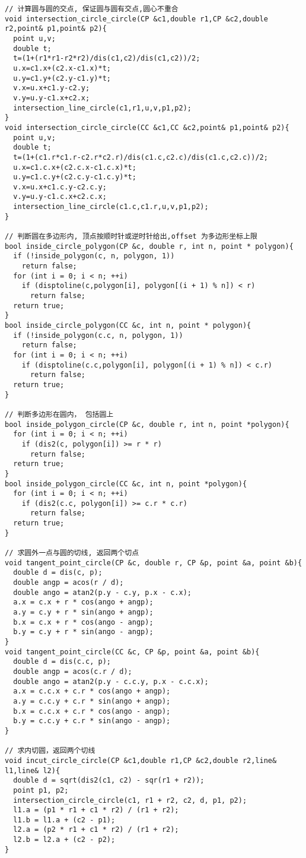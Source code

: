 \begin{lstlisting}[language={}]
// 计算圆与圆的交点, 保证圆与圆有交点,圆心不重合
void intersection_circle_circle(CP &c1,double r1,CP &c2,double r2,point& p1,point& p2){
  point u,v;
  double t;
  t=(1+(r1*r1-r2*r2)/dis(c1,c2)/dis(c1,c2))/2;
  u.x=c1.x+(c2.x-c1.x)*t;
  u.y=c1.y+(c2.y-c1.y)*t;
  v.x=u.x+c1.y-c2.y;
  v.y=u.y-c1.x+c2.x;
  intersection_line_circle(c1,r1,u,v,p1,p2);
}
void intersection_circle_circle(CC &c1,CC &c2,point& p1,point& p2){
  point u,v;
  double t;
  t=(1+(c1.r*c1.r-c2.r*c2.r)/dis(c1.c,c2.c)/dis(c1.c,c2.c))/2;
  u.x=c1.c.x+(c2.c.x-c1.c.x)*t;
  u.y=c1.c.y+(c2.c.y-c1.c.y)*t;
  v.x=u.x+c1.c.y-c2.c.y;
  v.y=u.y-c1.c.x+c2.c.x;
  intersection_line_circle(c1.c,c1.r,u,v,p1,p2);
}

// 判断圆在多边形内, 顶点按顺时针或逆时针给出,offset 为多边形坐标上限
bool inside_circle_polygon(CP &c, double r, int n, point * polygon){
  if (!inside_polygon(c, n, polygon, 1))
    return false;
  for (int i = 0; i < n; ++i)
    if (disptoline(c,polygon[i], polygon[(i + 1) % n]) < r)
      return false;
  return true;  
} 
bool inside_circle_polygon(CC &c, int n, point * polygon){
  if (!inside_polygon(c.c, n, polygon, 1))
    return false;
  for (int i = 0; i < n; ++i)
    if (disptoline(c.c,polygon[i], polygon[(i + 1) % n]) < c.r)
      return false;
  return true;  
} 

// 判断多边形在圆内， 包括圆上 
bool inside_polygon_circle(CP &c, double r, int n, point *polygon){
  for (int i = 0; i < n; ++i)
    if (dis2(c, polygon[i]) >= r * r)
      return false;
  return true;
}
bool inside_polygon_circle(CC &c, int n, point *polygon){
  for (int i = 0; i < n; ++i)
    if (dis2(c.c, polygon[i]) >= c.r * c.r)
      return false;
  return true;
}

// 求圆外一点与圆的切线, 返回两个切点 
void tangent_point_circle(CP &c, double r, CP &p, point &a, point &b){
  double d = dis(c, p);
  double angp = acos(r / d);
  double ango = atan2(p.y - c.y, p.x - c.x);
  a.x = c.x + r * cos(ango + angp);
  a.y = c.y + r * sin(ango + angp);
  b.x = c.x + r * cos(ango - angp);
  b.y = c.y + r * sin(ango - angp);
}
void tangent_point_circle(CC &c, CP &p, point &a, point &b){
  double d = dis(c.c, p);
  double angp = acos(c.r / d);
  double ango = atan2(p.y - c.c.y, p.x - c.c.x);
  a.x = c.c.x + c.r * cos(ango + angp);
  a.y = c.c.y + c.r * sin(ango + angp);
  b.x = c.c.x + c.r * cos(ango - angp);
  b.y = c.c.y + c.r * sin(ango - angp);
}

// 求内切圆，返回两个切线
void incut_circle_circle(CP &c1,double r1,CP &c2,double r2,line& l1,line& l2){
  double d = sqrt(dis2(c1, c2) - sqr(r1 + r2));
  point p1, p2;
  intersection_circle_circle(c1, r1 + r2, c2, d, p1, p2);
  l1.a = (p1 * r1 + c1 * r2) / (r1 + r2);
  l1.b = l1.a + (c2 - p1);
  l2.a = (p2 * r1 + c1 * r2) / (r1 + r2);
  l2.b = l2.a + (c2 - p2);
}


\end{lstlisting}
